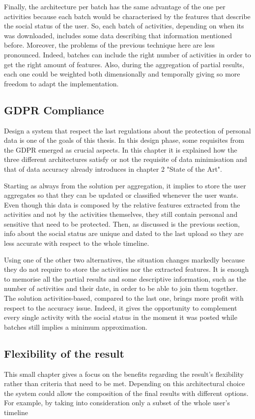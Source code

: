Finally, the architecture per batch has the same advantage of the one per activities because each batch would be characterised by the features that describe the social status of the user.
So, each batch of activities, depending on when its was downloaded, includes some data describing that information mentioned before.
Moreover, the problems of the previous technique here are less pronounced. Indeed, batches can include the right number of activities in order to get the right amount of features.
Also, during the aggregation of partial results, each one could be weighted both dimensionally and temporally giving so more freedom to adapt the implementation.


\subsection{GDPR Compliance}
Design a system that respect the last regulations about the protection of personal data is one of the goals of this thesis.
In this design phase, some requisites from the GDPR emerged as crucial aspects. In this chapter it is explained how the three different architectures satisfy or not the requisite of data minimisation and that of data accuracy already introduces in chapter 2 "State of the Art".

Starting as always from the solution per aggregation, it implies to store the user aggregates so that they can be updated or classified whenever the user wants.
Even though this data is composed by the relative features extracted from the activities and not by the activities themselves, they still contain personal and sensitive that need to be protected.
Then, as discussed is the previous section, info about the social status are unique and dated to the last upload so they are less accurate with respect to the whole timeline.

Using one of the other two alternatives, the situation changes markedly because they do not require to store the activities nor the extracted features. It is enough to memorise all the partial results and some descriptive information, such as the number of activities and their date, in order to be able to join them together.
The solution activities-based, compared to the last one, brings more profit with respect to the accuracy issue. Indeed, it gives the opportunity to complement every single activity with the social status in the moment it was posted while batches still implies a minimum approximation.

\subsection{Flexibility of the result}
This small chapter gives a focus on the benefits regarding the result's flexibility rather than criteria that need to be met.
Depending on this architectural choice the system could allow the composition of the final results with different options. For example, by taking into consideration only a subset of the whole user's timeline

